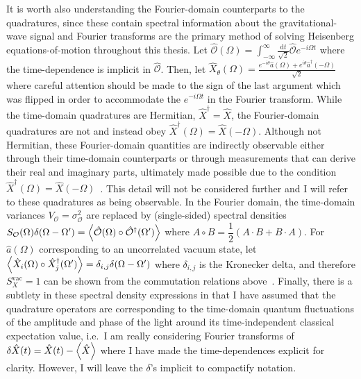 It is worth also understanding the Fourier-domain counterparts to the quadratures, since these contain spectral information about the gravitational-wave signal and Fourier transforms are the primary method of solving Heisenberg equations-of-motion throughout this thesis. Let $\hat{\mathcal{O}}(\Omega) = \int_{-\infty}^\infty \frac{\mathrm{d}t}{\sqrt{2}} \hat{\mathcal{O}} e^{-i\Omega t}$ where the time-dependence is implicit in $\hat{\mathcal{O}}$. Then, let $\hat{X}_\theta(\Omega)=\frac{e^{-i \theta}\hat{a}(\Omega)+e^{i \theta}\hat{a}^\dag(-\Omega)}{\sqrt{2}}$ where careful attention should be made to the sign of the last argument which was flipped in order to accommodate the $e^{-i\Omega t}$ in the Fourier transform. While the time-domain quadratures are Hermitian, $\hat{X}^\dag=\hat{X}$, the Fourier-domain quadratures are not and instead obey $\hat{X}^\dag(\Omega)=\hat{X}(-\Omega)$. Although not Hermitian, these Fourier-domain quantities are indirectly observable either through their time-domain counterparts or through measurements that can derive their real and imaginary parts, ultimately made possible due to the condition $\hat{X}^\dag(\Omega)=\hat{X}(-\Omega)$~\cite{sourcecitedinReid}. This detail will not be considered further and I will refer to these quadratures as being observable. 
In the Fourier domain, the time-domain variances $V_\mathcal{O}=\sigma_\mathcal{O}^2$ are replaced by (single-sided) spectral densities $S_\mathcal{O}(\Omega)\delta(\Omega-\Omega')=\ev{\hat{\mathcal{O}}(\Omega)\circ\hat{\mathcal{O}}^\dag(\Omega')}$ where $A\circ B=\dfrac{1}{2}(A\cdot B+B\cdot A)$. For $\hat{a}(\Omega)$ corresponding to an uncorrelated vacuum state, let $\ev{\hat{X}_i(\Omega)\circ\hat{X}_j^\dag(\Omega')}=\delta_{i,j}\delta(\Omega-\Omega')$ where $\delta_{i,j}$ is the Kronecker delta, and therefore $S_X^\text{vac}=1$ can be shown from the commutation relations above~\cite{Danilishin}. Finally, there is a subtlety in these spectral density expressions in that I have assumed that the quadrature operators are corresponding to the time-domain quantum fluctuations of the amplitude and phase of the light around its time-independent classical expectation value, i.e.\ I am really considering Fourier transforms of $\delta\hat{X}(t)=\hat{X}(t)-\ev{\hat{X}}$ where I have made the time-dependences explicit for clarity. However, I will leave the $\delta$'s implicit to compactify notation.



